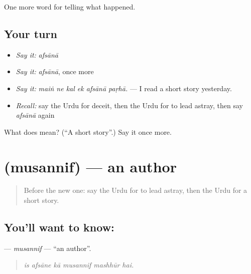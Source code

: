 \begin{grammarlens}[title={What you've built}]
One more word for telling what happened.
\end{grammarlens}

\subsection*{Your turn}
\begin{itemize}
\raggedright
  \item \emph{Say it:} \emph{afsānā}
  \item \emph{Say it:} \emph{afsānā}, once more
  \item \emph{Say it:} \emph{maiṅ ne kal ek afsānā paṛhā.} — I read a short story yesterday.
  \item \emph{Recall:} say the Urdu for deceit, then the Urdu for to lead astray, then say \emph{afsānā} again
\end{itemize}

\begin{tcolorbox}[breakable,colback=teal!4,colframe=teal!35!black,title={Before you move on}]
What does  mean? (\textquotedblleft{}A short story\textquotedblright{}.) Say it once more.
\end{tcolorbox}
\section[\texorpdfstring{\ur{مصنف} (musannif)}{مصنف (musannif)}]{ (musannif) — an author}

\label{lesson:UR-C329-musannif}



\begin{quote}
Before the new one: say the Urdu for to lead astray, then the Urdu for a short story.
\end{quote}

\subsection*{You'll want to know: }
\textbf{} — \emph{musannif} — \textquotedblleft{}an author\textquotedblright{}.

\begin{quote}
     
\end{quote}

\begin{quote}
\emph{is afsāne kā musannif mashhūr hai.}
\end{quote}

